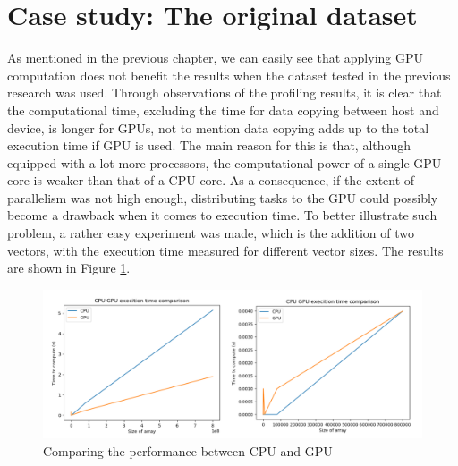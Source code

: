 \documentclass{PHlab-thesis}
\begin{document}
\section{Case study: The original dataset}
As mentioned in the previous chapter, we can easily see that applying GPU computation does not benefit the results when the dataset tested in the previous research was used. Through observations of the profiling results, it is clear that the computational time, excluding the time for data copying between host and device, is longer for GPUs, not to mention data copying adds up to the total execution time if GPU is used. The main reason for this is that, although equipped with a lot more processors, the computational power of a single GPU core is weaker than that of a CPU core. As a consequence, if the extent of parallelism was not high enough, distributing tasks to the GPU could possibly become a drawback when it comes to execution time. To better illustrate such problem, a rather easy experiment was made, which is the addition of two vectors, with the execution time measured for different vector sizes. The results are shown in Figure \ref{fig:cpugpuvec}.
\begin{figure}
	\centering
	\includegraphics[scale=0.3]{figures/cpugpu_vector.png}
	\caption{Comparing the performance between CPU and GPU}
	\label{fig:cpugpuvec} %
\end{figure}
\end{document}
